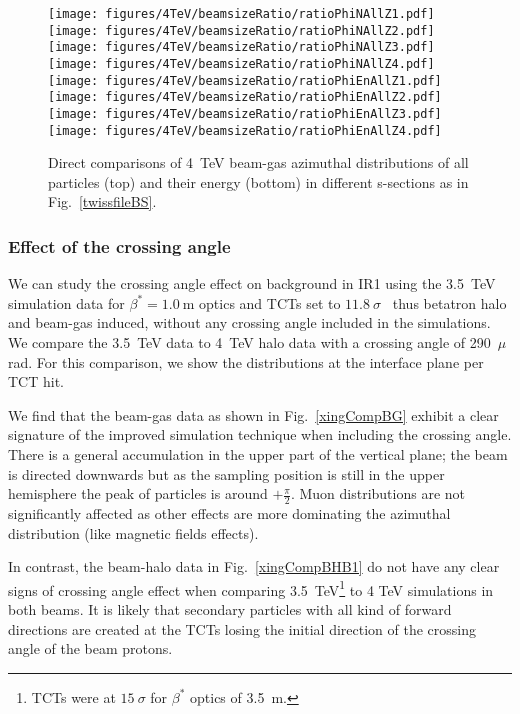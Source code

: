 \begin{figure}%
\begin{center}
  \texttt{[image: figures/4TeV/beamsizeRatio/ratioPhiNAllZ1.pdf]}
  \texttt{[image: figures/4TeV/beamsizeRatio/ratioPhiNAllZ2.pdf]}
  \texttt{[image: figures/4TeV/beamsizeRatio/ratioPhiNAllZ3.pdf]}
  \texttt{[image: figures/4TeV/beamsizeRatio/ratioPhiNAllZ4.pdf]}
  \texttt{[image: figures/4TeV/beamsizeRatio/ratioPhiEnAllZ1.pdf]}
  \texttt{[image: figures/4TeV/beamsizeRatio/ratioPhiEnAllZ2.pdf]}
  \texttt{[image: figures/4TeV/beamsizeRatio/ratioPhiEnAllZ3.pdf]}
  \texttt{[image: figures/4TeV/beamsizeRatio/ratioPhiEnAllZ4.pdf]}
\end{center}
\vspace{-0.6cm}
 \caption{Direct comparisons of 4~TeV beam-gas azimuthal distributions of all particles (top) and their energy (bottom) in different s-sections as in Fig.~\ref{twissfileBS}.
  \label{bsZAll}}
\end{figure}

 
\subsubsection{Effect of the crossing angle}

We can study the crossing angle effect on background in IR1 using the 3.5~TeV simulation data for $\beta^* = 1.0~$m optics and TCTs set to $11.8~\sigma$~\cite{nimPaperRod} thus betatron halo and beam-gas induced, without any crossing angle included in the simulations. We compare the 3.5~TeV data to 4~TeV halo data with a crossing angle of 290~$\mu$rad. For this comparison, we show the distributions at the interface plane per TCT hit. 

We find that the beam-gas data as shown in Fig.~\ref{xingCompBG} exhibit a clear signature of the improved simulation technique when including the crossing angle. There is a general accumulation in the upper part of the vertical plane; the beam is directed downwards but as the sampling position is still in the upper hemisphere the peak of particles is around $+ \frac{\pi}{2}$. Muon distributions are not significantly affected as other effects are more dominating the azimuthal distribution (like magnetic fields effects). 

In contrast, the beam-halo data in Fig.~\ref{xingCompBHB1} do not have any clear signs of crossing angle effect when comparing 3.5~TeV\footnote{TCTs were at $15~\sigma$ for $\beta^*$ optics of 3.5~m.} to 4 TeV simulations in both beams. It is likely that secondary particles with all kind of forward directions are created at the TCTs losing the initial direction of the crossing angle of the beam protons.

